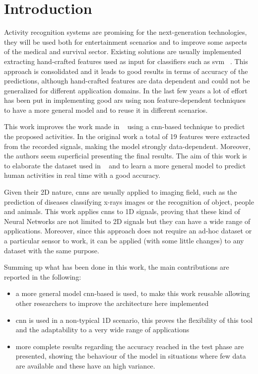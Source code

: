
\section{Introduction}
\label{sec:introduction}

Activity recognition systems are promising for the next-generation technologies, they will be used both for entertainment scenarios and to improve some aspects of the medical and survival sector.
Existing solutions are usually implemented extracting hand-crafted features used as input for classifiers such as \gls{svm} ~\cite{Elvira14, Hamalainen11, Khan10}.
This approach is consolidated and it leads to good results in terms of accuracy of the predictions, although hand-crafted features are data dependent and could not be generalized for different application domains.
In the last few years a lot of effort has been put in implementing good \gls{ars} using non feature-dependent techniques to have a more general model and to reuse it in different scenarios.

This work improves the work made in ~\cite{Frank10} using a \gls{cnn}-based technique to predict the proposed activities.
In the original work a total of 19 features were extracted from the recorded signals, making the model strongly data-dependent.
Moreover, the authors seem superficial presenting the final results.
The aim of this work is to elaborate the dataset used in ~\cite{Frank10} and to learn a more general model to predict human activities in real time with a good accuracy.

Given their 2D nature, \glspl{cnn} are usually applied to imaging field, such as the prediction of diseases classifying x-rays images or the recognition of object, people and animals.
This work applies \glspl{cnn} to 1D signals, proving that these kind of Neural Networks are not limited to 2D signals but they can have a wide range of applications.
Moreover, since this approach does not require an ad-hoc dataset or a particular sensor to work, it can be applied (with some little changes) to any dataset with the same purpose.

Summing up what has been done in this work, the main contributions are reported in the following:
\begin{itemize}
\item a more general model \gls{cnn}-based is used, to make this work reusable allowing other researchers to improve the architecture here implemented
\item \gls{cnn} is used in a non-typical 1D scenario, this proves the flexibility of this tool and the adaptability to a very wide range of applications
\item more complete results regarding the accuracy reached in the test phase are presented, showing the behaviour of the model in situations where few data are available and these have an high variance.
\end{itemize}

